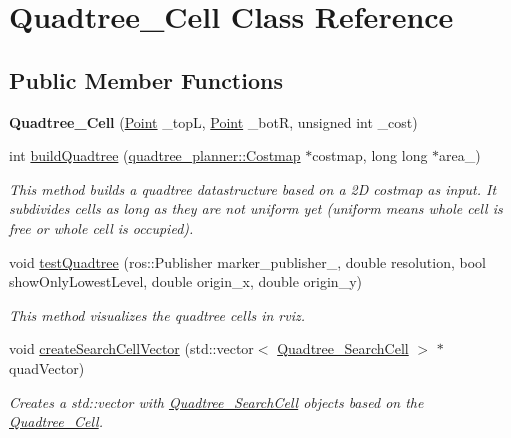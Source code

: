 \hypertarget{classQuadtree__Cell}{}\section{Quadtree\+\_\+\+Cell Class Reference}
\label{classQuadtree__Cell}
\subsection*{Public Member Functions}
\begin{DoxyCompactItemize}
\item 
\mbox{\label{classQuadtree__Cell_ad8e516e00e51b897ec5a26240c4b3373}} 
{\bfseries Quadtree\+\_\+\+Cell} (\hyperlink{structPoint}{Point} \+\_\+topL, \hyperlink{structPoint}{Point} \+\_\+botR, unsigned int \+\_\+cost)
\item 
int \hyperlink{classQuadtree__Cell_af2b30e86c7180372b97177d43888210c}{build\+Quadtree} (\hyperlink{classquadtree__planner_1_1Costmap}{quadtree\+\_\+planner\+::\+Costmap} $\ast$costmap, long long $\ast$area\+\_\+)
\begin{DoxyCompactList}\small\item\em This method builds a quadtree datastructure based on a 2D costmap as input. It subdivides cells as long as they are not uniform yet (uniform means whole cell is free or whole cell is occupied). \end{DoxyCompactList}\item 
void \hyperlink{classQuadtree__Cell_a30ac8c78fb0693cd7c8e1631fd312426}{test\+Quadtree} (ros\+::\+Publisher marker\+\_\+publisher\+\_\+, double resolution, bool show\+Only\+Lowest\+Level, double origin\+\_\+x, double origin\+\_\+y)
\begin{DoxyCompactList}\small\item\em This method visualizes the quadtree cells in rviz. \end{DoxyCompactList}\item 
void \hyperlink{classQuadtree__Cell_ae121e7759a290d90f3b4ab12f4460b47}{create\+Search\+Cell\+Vector} (std\+::vector$<$ \hyperlink{classQuadtree__SearchCell}{Quadtree\+\_\+\+Search\+Cell} $>$ $\ast$quad\+Vector)
\begin{DoxyCompactList}\small\item\em Creates a std\+::vector with \hyperlink{classQuadtree__SearchCell}{Quadtree\+\_\+\+Search\+Cell} objects based on the \hyperlink{classQuadtree__Cell}{Quadtree\+\_\+\+Cell}. \end{DoxyCompactList}\item 

\end{DoxyCompactItemize}
